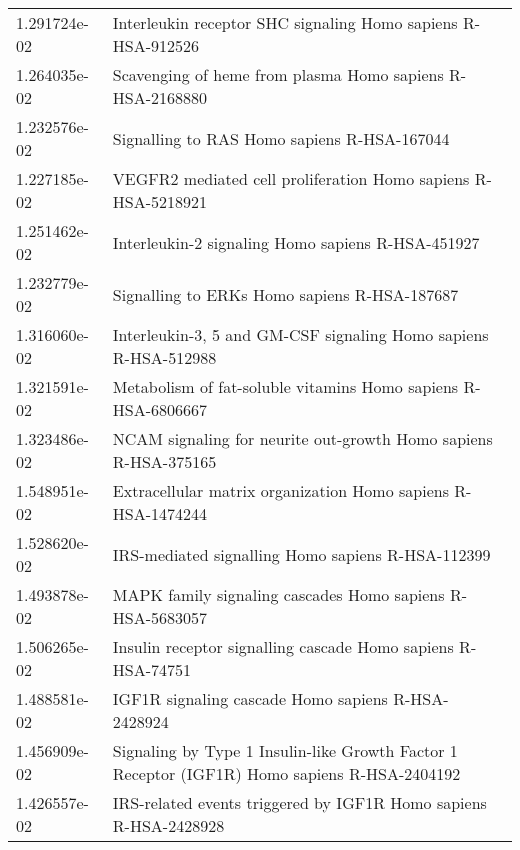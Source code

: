 \begin{longtable}{p{2.4cm}p{14.5cm}}
             1.291724e-02 &                                  Interleukin receptor SHC signaling Homo sapiens R-HSA-912526 \\
             1.264035e-02 &                                     Scavenging of heme from plasma Homo sapiens R-HSA-2168880 \\
             1.232576e-02 &                                                   Signalling to RAS Homo sapiens R-HSA-167044 \\
             1.227185e-02 &                                 VEGFR2 mediated cell proliferation Homo sapiens R-HSA-5218921 \\
             1.251462e-02 &                                             Interleukin-2 signaling Homo sapiens R-HSA-451927 \\
             1.232779e-02 &                                                  Signalling to ERKs Homo sapiens R-HSA-187687 \\
             1.316060e-02 &                               Interleukin-3, 5 and GM-CSF signaling Homo sapiens R-HSA-512988 \\
             1.321591e-02 &                                 Metabolism of fat-soluble vitamins Homo sapiens R-HSA-6806667 \\
             1.323486e-02 &                               NCAM signaling for neurite out-growth Homo sapiens R-HSA-375165 \\
             1.548951e-02 &                                  Extracellular matrix organization Homo sapiens R-HSA-1474244 \\
             1.528620e-02 &                                             IRS-mediated signalling Homo sapiens R-HSA-112399 \\
             1.493878e-02 &                                     MAPK family signaling cascades Homo sapiens R-HSA-5683057 \\
             1.506265e-02 &                                  Insulin receptor signalling cascade Homo sapiens R-HSA-74751 \\
             1.488581e-02 &                                            IGF1R signaling cascade Homo sapiens R-HSA-2428924 \\
             1.456909e-02 &  Signaling by Type 1 Insulin-like Growth Factor 1 Receptor (IGF1R) Homo sapiens R-HSA-2404192 \\
             1.426557e-02 &                              IRS-related events triggered by IGF1R Homo sapiens R-HSA-2428928 \\

\end{longtable}
